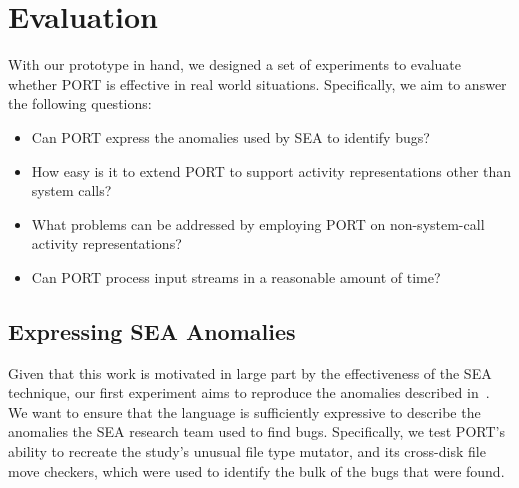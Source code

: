 \section{Evaluation}
\label{SEC:evaluation}

With our prototype in hand, we designed a set of experiments to evaluate
whether PORT is effective in real world situations.
Specifically, we aim to answer the following questions:

\begin{itemize}

  \item{Can PORT express the anomalies used by SEA to identify bugs?}

  \item{How easy is it to extend PORT to support activity representations
    other than system calls?}

  \item{What problems can be addressed by employing PORT on
  non-system-call activity representations?}

  \item{Can PORT process input streams in a reasonable amount of time?}

\end{itemize}


\subsection{Expressing SEA Anomalies}
\label{sub:SEAAnomalies}
Given that this work is motivated
in large part
by the effectiveness of the SEA technique,
our first experiment aims to reproduce the anomalies described
in~\cite{DBLP:conf/issre/MooreCFW19}.
We want to ensure that
the language is sufficiently expressive
to describe the anomalies the
SEA research team used to
find bugs.
Specifically,
we test PORT's ability to recreate
the study's unusual file type mutator,
and its cross-disk file move checkers, which were used to identify
the bulk of the bugs that were found.



